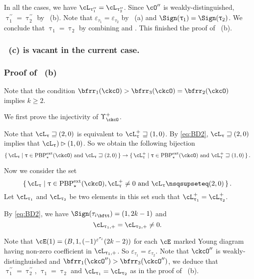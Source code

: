 \documentclass[12pt,a4paper]{amsart}
\numberwithin{equation}{section}
\theoremstyle{remark}
\def\PBPes{\mathrm{PBP}^{\mathrm{ext}}_{\star}}
\def\uptaupp{\uptau^{\prime\prime}}
\begin{document}
In all the cases, we have $\ac_{\uptaupp_1} = \ac_{\uptaupp_2}$. 
Since $\cO''$ is weakly-distinguished,   $\uptaupp_{1}=\uptaupp_{2}$ by
~(b). Note that $\varepsilon_{\tau_1}=\varepsilon_{\tau_2}$ by
~(a) and $\Sign(\uptau_{1})=\Sign(\uptau_{2})$. We conclude that  
$\uptau_{1}=\uptau_{2}$ by combining  and .
This finished the proof of ~(b).

\subsubsection*{~(c) is vacant in the current case.}


\subsubsection*{Proof of ~(b)}

Note that the condition $\bfrr_{1}(\ckcO)>\bfrr_{3}(\ckcO)=\bfrr_{2}(\ckcO)$
implies $k\geq 2$.

\medskip

We first prove the injectivity of $\Upsilon^{+}_{\ckcO}$. 

Note that
  $\ac_{\uptau}\sqsupseteq (2,0)$ is equivalent to $\pac{\uptau}\sqsupseteq
  (1,0)$. By \eqref{eq:BD2},  $\ac_{\uptau}\sqsupseteq (2,0)$ implies that $\ac_{\uptau})\rhd (1,0)$.
  So we obtain the following  bijection
  \[
    \set{\ac_{\uptau}|\uptau\in \PBPes(\ckcO) \text{ and }\ac_{\uptau}\sqsupseteq (2,0)} \rightarrow
     \set{\pac{\uptau}|\uptau\in \PBPes(\ckcO) \text{ and }\pac{\uptau}\sqsupseteq (1,0)}.
  \]

  Now we consider the set 
  \[
   \set{\ac_{\uptau}|\uptau\in \PBPes(\ckcO), 
  \pac{\uptau}\neq 0 \text{ and } \ac_{\uptau}\nsqsupseteq (2,0)}. 
  \] 
   Let $\ac_{\uptau_{1}}$
  and $\ac_{\uptau_{2}}$ be two elements in this set such that
  $\pac{\uptau_{1}}=\pac{\uptau_{2}}$.

  By \eqref{eq:BD2}, we have $\Sign(\ttail{\tau_{i}}) = (1,2k-1)$ and  
  \begin{equation}\label{eq:ft1}
  \ppac{\uptau_1} = \ppac{\uptau_2}\neq 0.
  \end{equation}
  
    Note that $\cE(1) = (B,1, (-1)^{\varepsilon^{\tau_{i}}}(2k-2))$ for each $\cE$ marked Young diagram having non-zero
    coefficient in $\ppac{\uptau_1}$. So $\varepsilon_{\tau_{1}}=\varepsilon_{\tau_{2}}$.
    Note that $\ckcO''$ is weakly-distinghuished and $\bfrr_{1}(\ckcO'')>\bfrr_{3}(\ckcO'')$, we deduce that
    $\uptaupp_1 = \uptaupp_2$, $\uptau_1 =\uptau_2$ and $\ac_{\uptau_1} = \ac_{\uptau_2}$ as in the proof of ~(b). 
\end{document}
